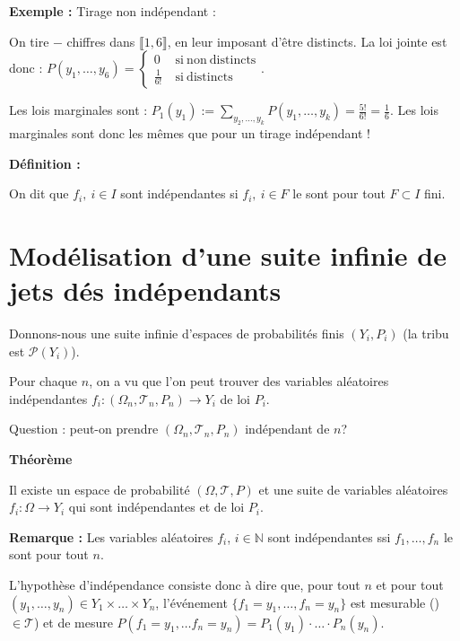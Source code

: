 \documentclass[10pt,a4paper,notitlepage ]{report}
\newenvironment{definition}{
	
	\textbf{Définition : }
}
{}
\newcounter{th}
\newenvironment{theorem}[1][]{
\refstepcounter{th}
\begin{tcolorbox}
	\textbf{Théorème \theth \ #1}
	
	
}{\end{tcolorbox}}
\newenvironment{exemple}{
	
	\textbf{Exemple :} }{}
\newenvironment{rem}{
	
	\textbf{Remarque :}}{}
\begin{document}
\begin{exemple}
	Tirage non indépendant :
	
	On tire $-$ chiffres dans $\llbracket 1,6 \rrbracket$, en leur imposant d'être distincts. La loi jointe est donc : $P(y_1, \dots, y_6) = \begin{cases}
		0 &\mathrm{\ si\  non\  distincts} \\
		\frac{1}{6!} &\mathrm{\ si\ distincts}
	\end{cases}$.

	Les lois marginales sont : $P_1(y_1):= \underset{y_2,\dots,y_k}{\sum} P(y_1,\dots,y_k) = \frac{5!}{6!} = \frac{1}{6}$. Les lois marginales sont donc les mêmes que pour un tirage indépendant !
\end{exemple}
\begin{definition}
	On dit que $f_i,\ i\in I$ sont indépendantes si $f_i,\ i\in F$ le sont pour tout $F\subset I$ fini.
\end{definition}

\section{Modélisation d'une suite infinie de jets dés indépendants}

Donnons-nous une suite infinie d'espaces de probabilités finis $(Y_i,P_i)$ (la tribu est $\mathcal P(Y_i)$).

Pour chaque $n$, on a vu que l'on peut trouver des variables aléatoires indépendantes $f_i:(\Omega_n,\mathcal T_n, P_n) \rightarrow Y_i$ de loi $P_i$.

Question : peut-on prendre $(\Omega_n,\mathcal T_n, P_n)$ indépendant de $n$?

\begin{theorem}
	Il existe un espace de probabilité $(\Omega,\mathcal T, P)$ et une suite de variables aléatoires $f_i : \Omega \rightarrow Y_i$ qui sont indépendantes et de loi $P_i$.
\end{theorem}

\begin{rem}
	Les variables aléatoires $f_i$, $i\in \mathbb N$ sont indépendantes ssi $f_1, \dots, f_n$ le sont pour tout $n$.
\end{rem}

L'hypothèse d'indépendance consiste donc à dire que, pour tout $n$ et pour tout $(y_1, \dots, y_n) \in Y_1 \times \dots \times Y_n$, l'événement $\{f_1=y_1,\dots,f_n=y_n\}$ est mesurable ()$\in\mathcal T$) et de mesure $P(f_1=y_1, \dots f_n=y_n) = P_1(y_1)\cdot\dots\cdot P_n(y_n)$.
\end{document}
